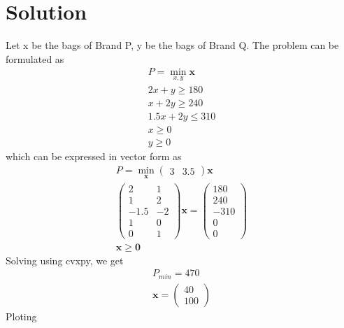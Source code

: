 \documentclass[journal,10pt,twocolumn]{article}
\let\vec\mathbf
\newcommand{\myvec}[1]{\ensuremath{\begin{pmatrix}#1\end{pmatrix}}}
\begin{document}
\section*{\large Solution}
Let x be the bags of Brand P, y be  the bags of Brand Q. The problem can be formulated as
\begin{align}
	P = \min_{x,y} \vec{x}\\
	2x + y \geq 180\\
	x + 2y \geq 240\\
	1.5x + 2y \leq 310\\
	x \geq 0\\
	y \geq 0
\end{align}
which can be expressed in vector form as
\begin{align}
	P = \min_{\vec{x}}\myvec{3&3.5}\vec{x}\\
	\myvec{2&1\\1&2\\-1.5&-2\\1&0\\0&1}\vec{x} = \myvec{180\\240\\-310\\0\\0}\\
	\vec{x} \geq \vec{0}
\end{align}
Solving using cvxpy, we get
\begin{align}
	P_{min} = 470\\
	\vec{x} = \myvec{40\\100}
\end{align}
Ploting
\end{document}
